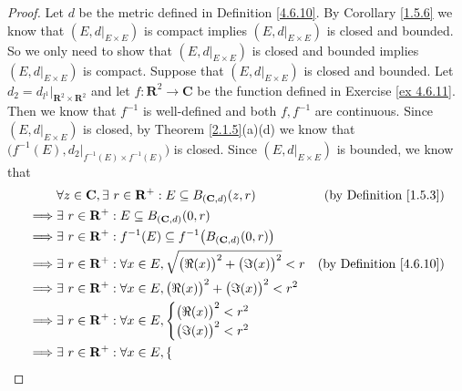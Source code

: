 \begin{proof}
    Let \(d\) be the metric defined in Definition \ref{4.6.10}.
    By Corollary \ref{1.5.6} we know that \((E, d|_{E \times E})\) is compact implies \((E, d|_{E \times E})\) is closed and bounded.
    So we only need to show that \((E, d|_{E \times E})\) is closed and bounded implies \((E, d|_{E \times E})\) is compact.
    Suppose that \((E, d|_{E \times E})\) is closed and bounded.
    Let \(d_2 = d_{l^1}|_{\mathbf{R}^2 \times \mathbf{R}^2}\) and let \(f : \mathbf{R}^2 \to \mathbf{C}\) be the function defined in Exercise \ref{ex 4.6.11}.
    Then we know that \(f^{-1}\) is well-defined and both \(f, f^{-1}\) are continuous.
    Since \((E, d|_{E \times E})\) is closed, by Theorem \ref{2.1.5}(a)(d) we know that \(\big(f^{-1}(E), d_2|_{f^{-1}(E) \times f^{-1}(E)}\big)\) is closed.
    Since \((E, d|_{E \times E})\) is bounded, we know that
    \begin{align*}
                 & \forall z \in \mathbf{C}, \exists\ r \in \mathbf{R}^+ : E \subseteq B_{(\mathbf{C}, d)}(z, r)     & \text{(by Definition \ref{1.5.3})}  \\
        \implies & \exists\ r \in \mathbf{R}^+ : E \subseteq B_{(\mathbf{C}, d)}(0, r)                                                                     \\
        \implies & \exists\ r \in \mathbf{R}^+ : f^{-1}(E) \subseteq f^{-1}\big(B_{(\mathbf{C}, d)}(0, r)\big)                                             \\
        \implies & \exists\ r \in \mathbf{R}^+ : \forall x \in E, \sqrt{\big(\Re(x)\big)^2 + \big(\Im(x)\big)^2} < r & \text{(by Definition \ref{4.6.10})} \\
        \implies & \exists\ r \in \mathbf{R}^+ : \forall x \in E, \big(\Re(x)\big)^2 + \big(\Im(x)\big)^2 < r^2                                            \\
        \implies & \exists\ r \in \mathbf{R}^+ : \forall x \in E, \begin{cases}
                                                                      \big(\Re(x)\big)^2 < r^2 \\
                                                                      \big(\Im(x)\big)^2 < r^2
                                                                  \end{cases}                                                                 \\
        \implies & \exists\ r \in \mathbf{R}^+ : \forall x \in E, \begin{cases}

\end{cases}
\end{align*}
\end{proof}

